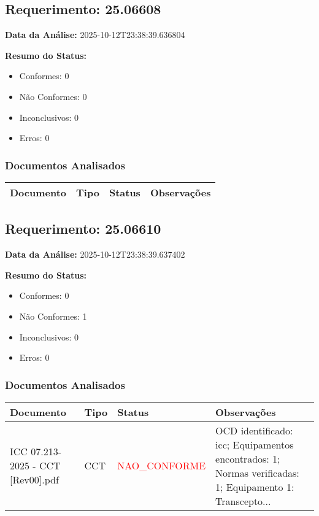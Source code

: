 \documentclass[12pt,a4paper]{article}
\begin{document}
\subsection{Requerimento: 25.06608}

\textbf{Data da Análise:} 2025-10-12T23:38:39.636804

\textbf{Resumo do Status:}
\begin{itemize}
    \item Conformes: 0
    \item Não Conformes: 0
    \item Inconclusivos: 0
    \item Erros: 0
\end{itemize}

\subsubsection{Documentos Analisados}

\begin{longtable}{|p{4cm}|p{2cm}|p{2cm}|p{6cm}|}
\hline
\textbf{Documento} & \textbf{Tipo} & \textbf{Status} & \textbf{Observações} \\
\hline
\endhead
\end{longtable}


\subsection{Requerimento: 25.06610}

\textbf{Data da Análise:} 2025-10-12T23:38:39.637402

\textbf{Resumo do Status:}
\begin{itemize}
    \item Conformes: 0
    \item Não Conformes: 1
    \item Inconclusivos: 0
    \item Erros: 0
\end{itemize}

\subsubsection{Documentos Analisados}

\begin{longtable}{|p{4cm}|p{2cm}|p{2cm}|p{6cm}|}
\hline
\textbf{Documento} & \textbf{Tipo} & \textbf{Status} & \textbf{Observações} \\
\hline
\endhead
ICC 07.213-2025 - CCT [Rev00].pdf & CCT & \textcolor{red}{NAO\_CONFORME} & OCD identificado: icc; Equipamentos encontrados: 1; Normas verificadas: 1; Equipamento 1: Transcepto... \\
\hline
\end{longtable}
\end{document}
